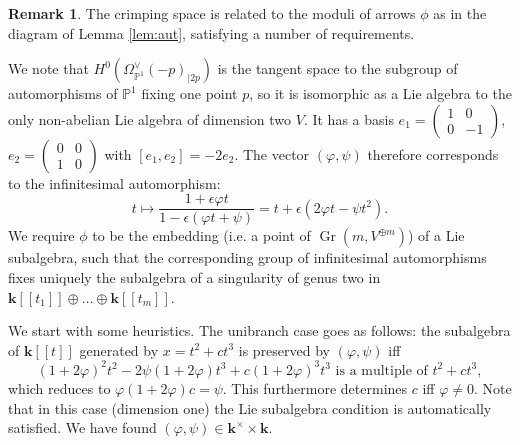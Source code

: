 \documentclass[11pt]{amsart}
\newcommand{\PP}{\mathbb P}
\renewcommand{\k}{\mathbf k}
\theoremstyle{plain}
\theoremstyle{definition}
\newtheorem{rem}[thm]{Remark}
\begin{document}
\begin{rem}
 The crimping space is related to the moduli of arrows $\phi$ as in the diagram of Lemma \ref{lem:aut}, satisfying a number of requirements.
 
 We note that $H^0(\Omega_{\PP^1}^\vee(-p)_{|2p})$ is the tangent space to the subgroup of automorphisms of $\PP^1$ fixing one point $p$, so it is isomorphic as a Lie algebra to the only non-abelian Lie algebra of dimension two $V$. It has a basis $e_1=\begin{pmatrix} 1 & 0 \\ 0 & -1\end{pmatrix}$, $e_2=\begin{pmatrix} 0 & 0 \\ 1 & 0\end{pmatrix}$ with $[e_1,e_2]=-2e_2$. The vector $(\varphi,\psi)$ therefore corresponds to the infinitesimal automorphism: \[t\mapsto\frac{1+\epsilon\varphi t}{1-\epsilon(\varphi t+\psi)}=t+\epsilon(2\varphi t-\psi t^2).\]
 We require $\phi$ to be the embedding (i.e. a point of $\operatorname{Gr}(m,V^{\oplus m})$) of a Lie subalgebra, such that the corresponding group of infinitesimal automorphisms fixes uniquely the subalgebra of a singularity of genus two in $\k[[t_1]]\oplus\ldots\oplus\k[[t_m]]$.
 
 We start with some heuristics. The unibranch case goes as follows: the subalgebra of $\k[[t]]$ generated by $x=t^2+ct^3$ is preserved by $(\varphi,\psi)$ iff
 \[(1+2\varphi)^2t^2-2\psi(1+2\varphi)t^3+c(1+2\varphi)^3t^3\text{ is a multiple of } t^2+ct^3,\]
 which reduces to $\varphi(1+2\varphi)c=\psi$. This furthermore determines $c$ iff $\varphi\neq 0$. Note that in this case (dimension one) the Lie subalgebra condition is automatically satisfied. We have found $(\varphi,\psi)\in\k^\times\times\k$.
 

\end{rem}
\end{document}

